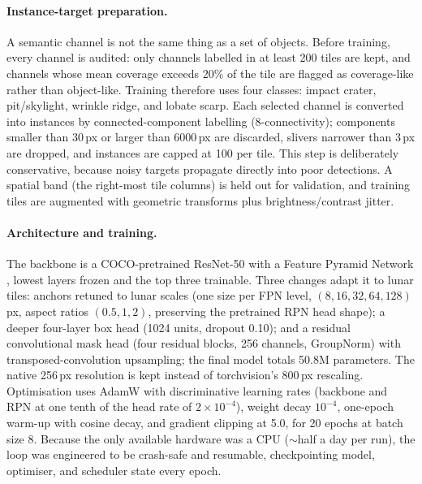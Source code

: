 \documentclass{aa}
\begin{document}
\paragraph{Instance-target preparation.}
A semantic channel is not the same thing as a set of objects. Before training, every channel is audited: only channels labelled in at least 200 tiles are kept, and channels whose mean coverage exceeds 20\% of the tile are flagged as coverage-like rather than object-like. Training therefore uses four classes: impact crater, pit/skylight, wrinkle ridge, and lobate scarp. Each selected channel is converted into instances by connected-component labelling (8-connectivity); components smaller than 30\,px or larger than 6000\,px are discarded, slivers narrower than 3\,px are dropped, and instances are capped at 100 per tile. This step is deliberately conservative, because noisy targets propagate directly into poor detections. A spatial band (the right-most tile columns) is held out for validation, and training tiles are augmented with geometric transforms plus brightness/contrast jitter.

\paragraph{Architecture and training.}
The backbone is a COCO-pretrained ResNet-50 with a Feature Pyramid Network \citep{he2016resnet,lin2017fpn}, lowest layers frozen and the top three trainable. Three changes adapt it to lunar tiles: anchors retuned to lunar scales (one size per FPN level, $(8,16,32,64,128)$\,px, aspect ratios $(0.5,1,2)$, preserving the pretrained RPN head shape); a deeper four-layer box head (1024 units, dropout 0.10); and a residual convolutional mask head (four residual blocks, 256 channels, GroupNorm) with transposed-convolution upsampling; the final model totals 50.8M parameters. The native 256\,px resolution is kept instead of torchvision's 800\,px rescaling. Optimisation uses AdamW \citep{loshchilov2019adamw} with discriminative learning rates (backbone and RPN at one tenth of the head rate of $2\times10^{-4}$), weight decay $10^{-4}$, one-epoch warm-up with cosine decay, and gradient clipping at 5.0, for 20 epochs at batch size 8. Because the only available hardware was a CPU (${\sim}$half a day per run), the loop was engineered to be crash-safe and resumable, checkpointing model, optimiser, and scheduler state every epoch.
\end{document}
